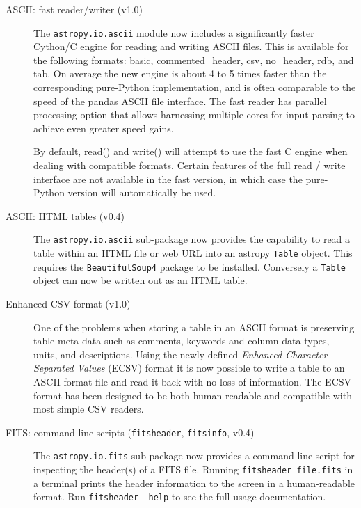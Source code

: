 \documentclass[modern]{aastex61}
\newcommand{\package}[1]{\texttt{#1}}
\begin{document}
\begin{description}

    \item[ASCII: fast reader/writer (v1.0)]

		The \package{astropy.io.ascii} module now includes a significantly faster
		Cython/C engine for reading and writing ASCII files. This is available
		for the following formats: basic, commented\_header, csv, no\_header,
		rdb, and tab.  On average the new engine is about 4 to 5 times faster
		than the corresponding pure-Python implementation, and is often
		comparable to the speed of the pandas ASCII file interface. The fast
		reader has parallel processing option that allows harnessing multiple
		cores for input parsing to achieve even greater speed gains.

		By default, read() and write() will attempt to use the fast C engine when
		dealing with compatible formats. Certain features of the full read / write
		interface are not available in the fast version, in which case the
		pure-Python version will automatically be used.

    \item[ASCII: HTML tables (v0.4)]

		The \package{astropy.io.ascii} sub-package now provides the capability
		to read a table within an HTML file or web URL into an astropy
		\texttt{Table} object. This requires the \package{BeautifulSoup4}
		package to be installed.  Conversely a \texttt{Table} object can now
		be written out as an HTML table.

	\item [Enhanced CSV format (v1.0)]

		One of the problems when storing a table in an ASCII format is
		preserving table meta-data such as comments, keywords and column data
		types, units, and descriptions. Using the newly defined \emph{Enhanced
		Character Separated Values} (ECSV) format it is now possible to write
		a table to an ASCII-format file and read it back with no loss of
		information. The ECSV format has been designed to be both
		human-readable and compatible with most simple CSV readers.

	\item [FITS: command-line scripts (\texttt{fitsheader}, \texttt{fitsinfo}, v0.4)]

		The \package{astropy.io.fits} sub-package now provides a command line
		script for inspecting the header(s) of a FITS file.  Running
		\texttt{fitsheader file.fits} in a terminal prints the header
		information to the screen in a human-readable format. Run
		\texttt{fitsheader --help} to see the full usage documentation.


\end{description}
\end{document}
